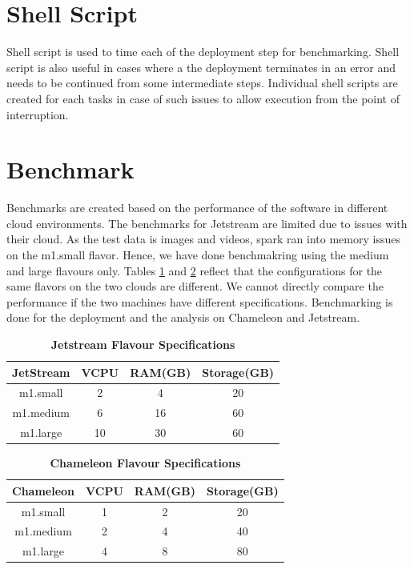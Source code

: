 \documentclass[9pt,twocolumn,twoside]{../../styles/osajnl}
\begin{document}
\section{Shell Script}
Shell script is used to time each of the deployment step for
benchmarking. Shell script is also useful in cases where a the
deployment terminates in an error and needs to be continued from some
intermediate steps. Individual shell scripts are created for each
tasks in case of such issues to allow execution from the point of
interruption.

\section{Benchmark}
Benchmarks are created based on the performance of the software in
different cloud environments. The benchmarks for Jetstream are limited
due to issues with their cloud. As the test data is images and videos,
spark ran into memory issues on the m1.small flavor. Hence, we have
done benchmakring using the medium and large flavours only. Tables
\ref{tab:jet} and \ref{tab:cham} reflect that the configurations for
the same flavors on the two clouds are different. We cannot directly
compare the performance if the two machines have different
specifications. Benchmarking is done for the deployment and the
analysis on Chameleon and Jetstream.

\begin{table}[htbp]
\centering
\begin{tabular} {| c | c | c | c |}
\hline JetStream & VCPU & RAM(GB) & Storage(GB)\\[0.5ex] \hline
m1.small & 2 & 4 & 20 \\ \hline m1.medium & 6 & 16 & 60 \\ \hline
m1.large & 10 & 30 & 60 \\[1ex] \hline
\end{tabular}

\caption{\bf Jetstream Flavour Specifications}
\label{tab:jet}
\end{table}

\begin{table}[htbp]
\centering
\begin{tabular} {| c | c | c | c |}
\hline Chameleon & VCPU & RAM(GB) & Storage(GB)\\[0.5ex] \hline
m1.small & 1 & 2 & 20 \\ \hline m1.medium & 2 & 4 & 40 \\ \hline
m1.large & 4 & 8 & 80 \\[1ex] \hline
\end{tabular}

\caption{\bf Chameleon Flavour Specifications}
\label{tab:cham}
\end{table}
\end{document}
